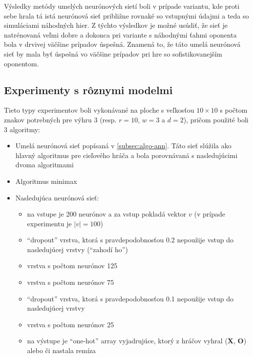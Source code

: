 Výsledky metódy umelých neurónových sietí boli v prípade variantu, kde proti sebe hrala tá istá neurónová sieť
približne rovnaké so vstupnými údajmi a teda so simuláciami náhodných hier.
Z týchto výsledkov je možné usúdiť, že sieť je natrénovaná veľmi dobre a dokonca pri variante s náhodnými ťahmi oponenta
bola v drvivej väčšine prípadov úspešná.
Znamená to, že táto umelá neurónová sieť by mala byť úspešná vo väčšine prípadov pri hre so sofistikovanejším oponentom.

\subsection{Experimenty s rôznymi modelmi}\label{subsec:experiments-versus}
Tieto typy experimentov boli vykonávané na ploche s veľkosťou $10 \times 10$ s počtom znakov potrebných pre výhru 3
(resp. $r = 10$, $w = 3$ a $d = 2$), pričom použité boli 3 algoritmy:
\begin{itemize}
    \item Umelá neurónová sieť popísaná v \autoref{subsec:algo-ann}.
    Táto sieť slúžila ako hlavný algoritmus pre cieľového hráča a bola porovnávaná s nasledujúcimi dvoma algoritmami
    \item Algoritmus minimax
    \item Nasledujúca neurónová sieť:\cite{first_ann}
    \begin{itemize}
        \item na vstupe je 200 neurónov a za vstup pokladá vektor $v$ (v prípade experimentu je $|v|=100$)
        \item \enquote{dropout} vrstva, ktorá s pravdepodobnosťou 0.2 nepoužije vstup do nasledujúcej vrstvy (\enquote{zahodí ho})
        \item vrstva s počtom neurónov 125
        \item vrstva s počtom neurónov 75
        \item \enquote{dropout} vrstva, ktorá s pravdepodobnosťou 0.1 nepoužije vstup do nasledujúcej vrstvy
        \item vrstva s počtom neurónov 25
        \item na výstupe je \enquote{one-hot} array vyjadrujúce, ktorý z hráčov vyhral (\textbf{X}, \textbf{O}) alebo či nastala remíza
    \end{itemize}
\end{itemize}

